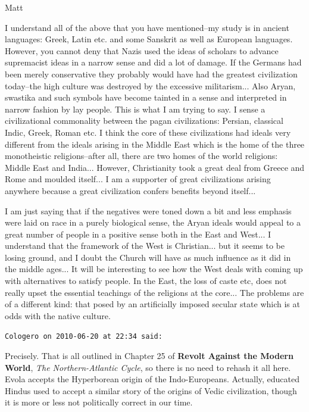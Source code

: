 \begin{footnotesize}
\begin{sffamily}
Matt

I understand all of the above that you have mentioned--my study is in ancient languages: Greek, Latin etc. and some Sanskrit as well as European languages. However, you cannot deny that Nazis used the ideas of scholars to advance supremacist ideas in a narrow sense and did a lot of damage. If the Germans had been merely conservative they probably would have had the greatest civilization today--the high culture was destroyed by the excessive militarism... Also Aryan, swastika and such symbols have become tainted in a sense and interpreted in narrow fashion by lay people. This is what I am trying to say. I sense a civilizational commonality between the pagan civilizations: Persian, classical Indic, Greek, Roman etc. I think the core of these civilizations had ideals very different from the ideals arising in the Middle East which is the home of the three monotheistic religions--after all, there are two homes of the world religions: Middle East and India... However, Christianity took a great deal from Greece and Rome and moulded itself... I am a supporter of great civilizations arising anywhere because a great civilization confers benefits beyond itself... 

I am just saying that if the negatives were toned down a bit and less emphasis were laid on race in a purely biological sense, the Aryan ideals would appeal to a great number of people in a positive sense both in the East and West... I understand that the framework of the West is Christian... but it seems to be losing ground, and I doubt the Church will have as much influence as it did in the middle ages... It will be interesting to see how the West deals with coming up with alternatives to satisfy people. In the East, the loss of caste etc, does not really upset the essential teachings of the religions at the core... The problems are of a different kind: that posed by an artificially imposed secular state which is at odds with the native culture.

\hfill

\texttt{Cologero on 2010-06-20 at 22:34 said:}

Precisely. That is all outlined in Chapter 25 of \textbf{Revolt Against the Modern World}, \emph{The Northern-Atlantic Cycle}, so there is no need to rehash it all here. Evola accepts the Hyperborean origin of the Indo-Europeans. Actually, educated Hindus used to accept a similar story of the origins of Vedic civilization, though it is more or less not politically correct in our time.


\end{sffamily}
\end{footnotesize}

